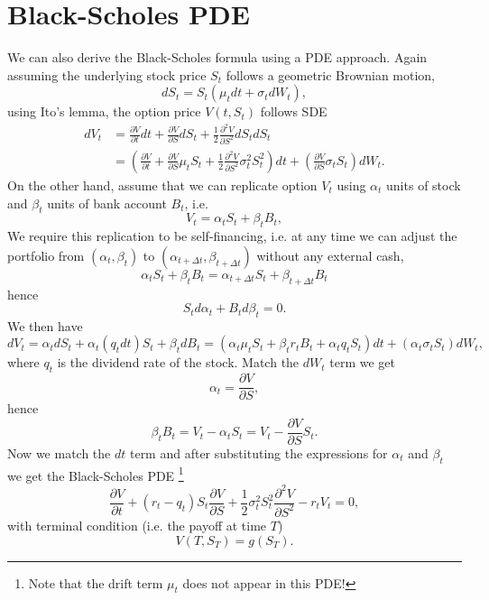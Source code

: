 \section{Black-Scholes PDE}
We can also derive the Black-Scholes formula using a PDE approach. Again
assuming the underlying stock price $S_t$ follows a geometric Brownian motion,
\[
	dS_t = S_t( \mu_t dt + \sigma_t dW_t),
\]
using Ito's lemma, the option price $V(t,S_t)$ follows SDE
\begin{align*}
	dV_t &= \frac{\partial V}{\partial t} dt 
	      + \frac{\partial V}{\partial S} dS_t
	      + \frac{1}{2} \frac{\partial^2 V}{\partial S^2} dS_t dS_t \\ 
			&= \left(  
	         \frac{\partial V}{\partial t} 
      	   + \frac{\partial V}{\partial S} \mu_t S_t
	         + \frac{1}{2} \frac{\partial^2 V}{\partial S^2} \sigma_t^2 S_t^2
			   \right) dt
				 + \left( \frac{\partial V}{\partial S} \sigma_t S_t \right) dW_t.
\end{align*}
On the other hand, assume that we can replicate option $V_t$ using $\alpha_t$
units of stock and $\beta_t$ units of bank account $B_t$, i.e.
\[
	V_t = \alpha_t S_t + \beta_t B_t,
\]
We require this replication to be self-financing, i.e. at any time we can adjust
the portfolio from $(\alpha_t,\beta_t)$ to 
$(\alpha_{t+\Delta t},\beta_{t+\Delta t})$ without any external cash, 
\[
  \alpha_t S_t + \beta_t B_t
  = \alpha_{t+\Delta t} S_t + \beta_{t+\Delta t} B_t
\]
hence
\[
  S_t d\alpha_t + B_t d\beta_t = 0.
\]
We then have
\[
	dV_t = \alpha_t dS_t + \alpha_t (q_t dt) S_t + \beta_t dB_t
	     = ( \alpha_t \mu_t S_t + \beta_t r_t B_t + \alpha_t q_t S_t) dt
			   + (\alpha_t \sigma_t S_t) dW_t,
\]
where $q_t$ is the dividend rate of the stock.
Match the $dW_t$ term we get
\[
	\alpha_t = \frac{\partial V}{\partial S},
\]
hence 
\[
	\beta_t B_t = V_t - \alpha_t S_t = V_t - \frac{\partial V}{\partial S} S_t.
\]
Now we match the $dt$ term and after substituting the expressions for $\alpha_t$
and $\beta_t$ we get the Black-Scholes PDE
\footnote{Note that the drift term $\mu_t$ does not appear in this PDE!}
\begin{equation}
	\frac{\partial V}{\partial t} 
	+ (r_t - q_t) S_t \frac{\partial V}{\partial S} 
	+ \frac{1}{2} \sigma_t^2 S_t^2 \frac{\partial^2 V}{\partial S^2} 
	- r_t V_t =0,
\end{equation}
with terminal condition (i.e. the payoff at time $T$)
\[
	V(T,S_T) = g(S_T).
\]

